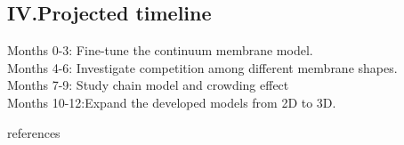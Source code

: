 \documentclass[12pt]{article}
\begin{document}
\begin{flushleft}
\subsection*{IV.Projected timeline}

Months 0-3: Fine-tune the continuum membrane model.\\
Months 4-6: Investigate competition among different membrane shapes.\\
Months 7-9: Study chain model and crowding effect\\
Months 10-12:Expand the developed models from 2D to 3D.\\









\newpage

\end{flushleft}

 {references}  
\end{document}
